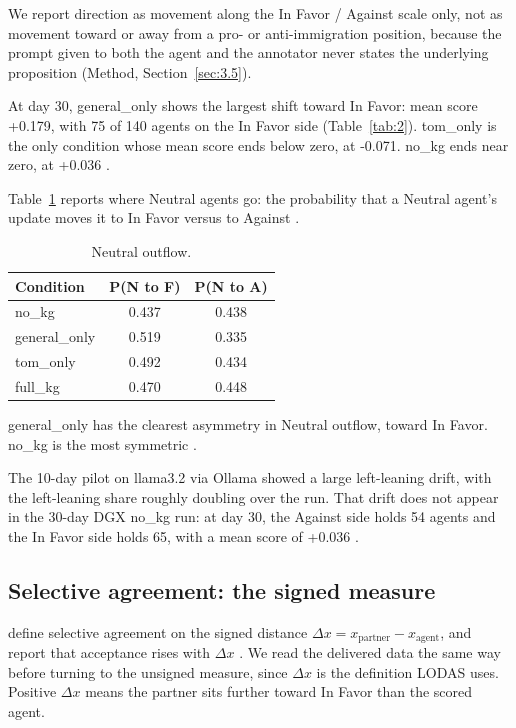 \documentclass[11pt,a4paper]{article}
\newcommand{\src}[1]{\unskip\marginpar{\raggedright\tiny\textcolor{gray}{#1}}}
\newcommand{\src}[1]{\unskip}
\newcommand{\cond}[1]{\textsf{#1}}
\begin{document}
We report direction as movement along the In Favor / Against scale only, not as movement toward or away from a pro- or anti-immigration position, because the prompt given to both the agent and the annotator never states the underlying proposition (Method, Section~\ref{sec:3.5}).

At day 30, \cond{general\_only} shows the largest shift toward In Favor: mean score +0.179, with 75 of 140 agents on the In Favor side (Table~\ref{tab:2}). \cond{tom\_only} is the only condition whose mean score ends below zero, at -0.071. \cond{no\_kg} ends near zero, at +0.036 \src{R: full\_ablation\_summary.md, Section 2.2}.

Table~\ref{tab:4} reports where Neutral agents go: the probability that a Neutral agent's update moves it to In Favor versus to Against \src{R: full\_ablation\_summary.md, Section 2.3}.

\begin{table}[htbp]
\centering
\small
\caption{Neutral outflow.}
\label{tab:4}
\begin{tabular}{lcc}
\toprule
Condition & P(N to F) & P(N to A) \\
\midrule
\cond{no\_kg} & 0.437 & 0.438 \\
\cond{general\_only} & 0.519 & 0.335 \\
\cond{tom\_only} & 0.492 & 0.434 \\
\cond{full\_kg} & 0.470 & 0.448 \\
\bottomrule
\end{tabular}
\end{table}

\cond{general\_only} has the clearest asymmetry in Neutral outflow, toward In Favor. \cond{no\_kg} is the most symmetric \src{R: full\_ablation\_summary.md, Section 2.3}.

The 10-day pilot on llama3.2 via Ollama showed a large left-leaning drift, with the left-leaning share roughly doubling over the run. That drift does not appear in the 30-day DGX \cond{no\_kg} run: at day 30, the Against side holds 54 agents and the In Favor side holds 65, with a mean score of +0.036 \src{R: full\_ablation\_summary.md, Section 4}.

\subsection{Selective agreement: the signed measure}\label{sec:5.3}

\citet{cau2025selective} define selective agreement on the signed distance $\Delta x = x_{\mathrm{partner}} - x_{\mathrm{agent}}$, and report that acceptance rises with $\Delta x$ \citep{cau2025selective}. We read the delivered data the same way before turning to the unsigned measure, since $\Delta x$ is the definition LODAS uses. Positive $\Delta x$ means the partner sits further toward In Favor than the scored agent.
\end{document}
